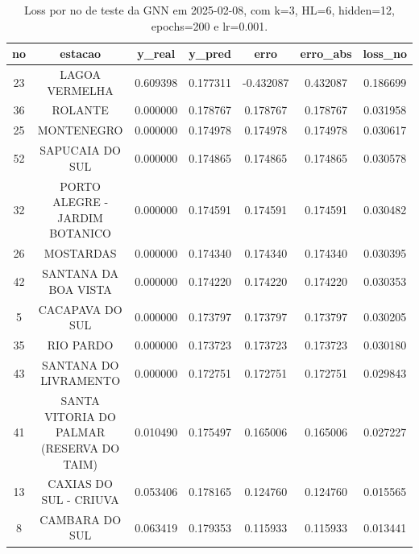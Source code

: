 \begin{table}[h]
\centering
\caption{Loss por no de teste da GNN em 2025-02-08, com k=3, HL=6, hidden=12, epochs=200 e lr=0.001.}
\label{tab:gnn_loss_k3_hl6_h12_e200_d20250208}
\begin{tabular}{ccccccc}
\toprule
no & estacao & y\_real & y\_pred & erro & erro\_abs & loss\_no \\
\midrule
23 & LAGOA VERMELHA & 0.609398 & 0.177311 & -0.432087 & 0.432087 & 0.186699 \\
36 & ROLANTE & 0.000000 & 0.178767 & 0.178767 & 0.178767 & 0.031958 \\
25 & MONTENEGRO & 0.000000 & 0.174978 & 0.174978 & 0.174978 & 0.030617 \\
52 & SAPUCAIA DO SUL & 0.000000 & 0.174865 & 0.174865 & 0.174865 & 0.030578 \\
32 & PORTO ALEGRE - JARDIM BOTANICO & 0.000000 & 0.174591 & 0.174591 & 0.174591 & 0.030482 \\
26 & MOSTARDAS & 0.000000 & 0.174340 & 0.174340 & 0.174340 & 0.030395 \\
42 & SANTANA DA BOA VISTA & 0.000000 & 0.174220 & 0.174220 & 0.174220 & 0.030353 \\
5 & CACAPAVA DO SUL & 0.000000 & 0.173797 & 0.173797 & 0.173797 & 0.030205 \\
35 & RIO PARDO & 0.000000 & 0.173723 & 0.173723 & 0.173723 & 0.030180 \\
43 & SANTANA DO LIVRAMENTO & 0.000000 & 0.172751 & 0.172751 & 0.172751 & 0.029843 \\
41 & SANTA VITORIA DO PALMAR (RESERVA DO TAIM) & 0.010490 & 0.175497 & 0.165006 & 0.165006 & 0.027227 \\
13 & CAXIAS DO SUL - CRIUVA & 0.053406 & 0.178165 & 0.124760 & 0.124760 & 0.015565 \\
8 & CAMBARA DO SUL & 0.063419 & 0.179353 & 0.115933 & 0.115933 & 0.013441 \\
\bottomrule
\end{tabular}
\end{table}
